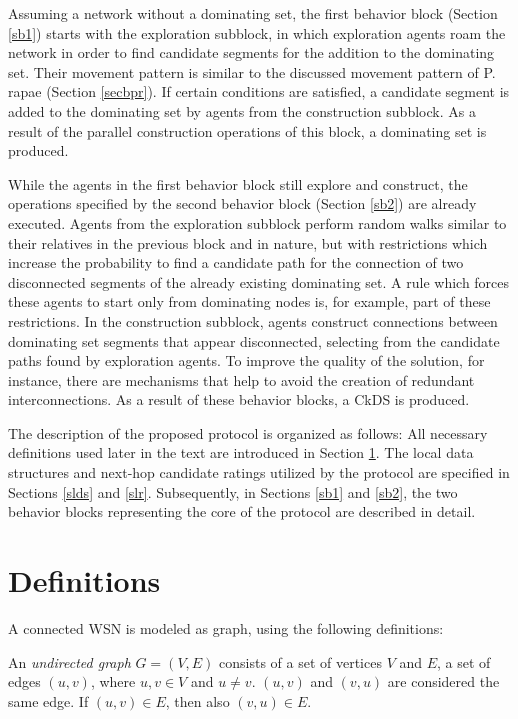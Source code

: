 Assuming a network without a dominating set, the first behavior block (Section \ref{sb1}) starts with the exploration subblock, in which exploration agents roam the network in order to find candidate segments for the addition to the dominating set. Their movement pattern is similar to the discussed movement pattern of P. rapae (Section \ref{secbpr}). If certain conditions are satisfied, a candidate segment is added to the dominating set by agents from the construction subblock. As a result of the parallel construction operations of this block, a dominating set is produced.



While the agents in the first behavior block still explore and construct, the operations specified by the second behavior block (Section \ref{sb2}) are already executed. Agents from the exploration subblock perform random walks similar to their relatives in the previous block and in nature, but with restrictions which increase the probability to find a candidate path for the connection of two disconnected segments of the already existing dominating set. A rule which forces these agents to start only from dominating nodes is, for example, part of these restrictions. In the construction subblock, agents construct connections between dominating set segments that appear disconnected, selecting from the candidate paths found by exploration agents. To improve the quality of the solution, for instance, there are mechanisms that help to avoid the creation of redundant interconnections. As a result of these behavior blocks, a CkDS is produced.

The description of the proposed protocol is organized as follows: All necessary definitions used later in the text are introduced in Section \ref{cds_ckds_def}. The local data structures and next-hop candidate ratings utilized by the protocol are specified in Sections \ref{slds} and \ref{slr}. Subsequently, in Sections \ref{sb1} and \ref{sb2}, the two behavior blocks representing the core of the protocol are described in detail.

\section{Definitions}\label{cds_ckds_def}\label{sec_d}

A connected WSN is modeled as graph, using the following definitions:

\begin{definition}\label{defgpure}

An \emph{undirected graph} $G = (V,E)$ consists of a set of vertices $V$ and $E$, a set of edges $(u,v)$, where $u,v \in V$ and $u\neq v$. $(u,v)$ and $(v,u)$ are considered the same edge. If $(u,v)\in E$, then also $(v,u)\in E$.

\end{definition}

